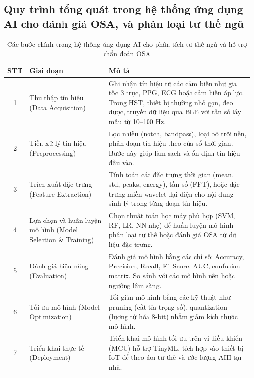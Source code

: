 \subsection{Quy trình tổng quát trong hệ thống ứng dụng AI cho đánh giá OSA, và phân loại tư thế ngủ}
\begin{table}[htbp]
\centering
\caption{Các bước chính trong hệ thống ứng dụng AI cho 
phân tích tư thế ngủ và hỗ trợ chẩn đoán OSA}
\label{tab:pipeline_steps}  %
\begin{tabular}{|c|p{4cm}|p{8cm}|}
\hline
\textbf{STT} & \textbf{Giai đoạn} & \textbf{Mô tả} \\
\hline
1 & Thu thập tín hiệu \newline (Data Acquisition) & 
Ghi nhận tín hiệu từ các cảm biến như gia tốc 3 trục, PPG, ECG hoặc cảm biến áp lực. Trong HST, thiết bị thường nhỏ gọn, đeo được, truyền dữ liệu qua BLE với tần số lấy mẫu từ 10–100 Hz. \\
\hline
2 & Tiền xử lý tín hiệu \newline (Preprocessing) & 
Lọc nhiễu (notch, bandpass), loại bỏ trôi nền, phân đoạn tín hiệu theo cửa sổ thời gian. Bước này giúp làm sạch và ổn định tín hiệu đầu vào. \\
\hline
3 & Trích xuất đặc trưng \newline (Feature Extraction) & 
Tính toán các đặc trưng thời gian (mean, std, peaks, energy), tần số (FFT), hoặc đặc trưng miền wavelet đại diện cho nội dung sinh lý trong từng đoạn tín hiệu. \\
\hline
4 & Lựa chọn và huấn luyện mô hình \newline (Model Selection \& Training) & 
Chọn thuật toán học máy phù hợp (SVM, RF, LR, NN nhẹ) để huấn luyện mô hình phân loại tư thế hoặc đánh giá OSA từ dữ liệu đặc trưng. \\
\hline
5 & Đánh giá hiệu năng \newline (Evaluation) & 
Đánh giá mô hình bằng các chỉ số: Accuracy, Precision, Recall, F1-Score, AUC, confusion matrix. So sánh với các mô hình nền hoặc ngưỡng lâm sàng. \\
\hline
6 & Tối ưu mô hình \newline (Model Optimization) & 
Tối giản mô hình bằng các kỹ thuật như pruning (cắt tỉa trọng số), quantization (lượng tử hóa 8-bit) nhằm giảm kích thước mô hình. \\
\hline
7 & Triển khai thực tế \newline (Deployment) & 
Triển khai mô hình tối ưu trên vi điều khiển (MCU) hỗ trợ TinyML, tích hợp vào thiết bị IoT để theo dõi tư thế và ước lượng AHI tại nhà. \\
\hline
\end{tabular}
\label{tab:pipeline_steps}
\end{table}

